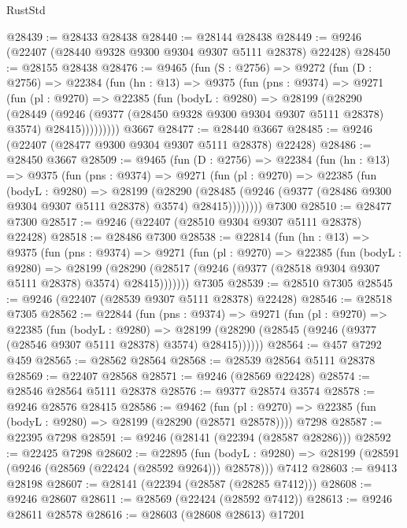 \begin{lexlean}{RustStd}
\begin{coremodule}
@28439 := @28433 @28438
@28440 := @28144 @28438
@28449 := @9246 (@22407 (@28440 @9328 @9300 @9304 @9307 @5111 @28378) @22428)
@28450 := @28155 @28438
@28476 := @9465
    (fun (S : @2756) =>
    @9272
      (fun (D : @2756) =>
      @22384
        (fun (hn : @13) =>
        @9375
          (fun (pns : @9374) =>
          @9271
            (fun (pl : @9270) =>
            @22385
              (fun (bodyL : @9280) =>
              @28199
                (@28290
                  (@28449
                    (@9246
                      (@9377 (@28450 @9328 @9300 @9304 @9307 @5111 @28378) @3574)
                      @28415)))))))))
    @3667
@28477 := @28440 @3667
@28485 := @9246 (@22407 (@28477 @9300 @9304 @9307 @5111 @28378) @22428)
@28486 := @28450 @3667
@28509 := @9465
    (fun (D : @2756) =>
    @22384
      (fun (hn : @13) =>
      @9375
        (fun (pns : @9374) =>
        @9271
          (fun (pl : @9270) =>
          @22385
            (fun (bodyL : @9280) =>
            @28199
              (@28290
                (@28485 (@9246 (@9377 (@28486 @9300 @9304 @9307 @5111 @28378) @3574) @28415))))))))
    @7300
@28510 := @28477 @7300
@28517 := @9246 (@22407 (@28510 @9304 @9307 @5111 @28378) @22428)
@28518 := @28486 @7300
@28538 := @22814
    (fun (hn : @13) =>
    @9375
      (fun (pns : @9374) =>
      @9271
        (fun (pl : @9270) =>
        @22385
          (fun (bodyL : @9280) =>
          @28199
            (@28290 (@28517 (@9246 (@9377 (@28518 @9304 @9307 @5111 @28378) @3574) @28415)))))))
    @7305
@28539 := @28510 @7305
@28545 := @9246 (@22407 (@28539 @9307 @5111 @28378) @22428)
@28546 := @28518 @7305
@28562 := @22844
    (fun (pns : @9374) =>
    @9271
      (fun (pl : @9270) =>
      @22385
        (fun (bodyL : @9280) =>
        @28199 (@28290 (@28545 (@9246 (@9377 (@28546 @9307 @5111 @28378) @3574) @28415))))))
@28564 := @457 @7292 @459
@28565 := @28562 @28564
@28568 := @28539 @28564 @5111 @28378
@28569 := @22407 @28568
@28571 := @9246 (@28569 @22428)
@28574 := @28546 @28564 @5111 @28378
@28576 := @9377 @28574 @3574
@28578 := @9246 @28576 @28415
@28586 := @9462
    (fun (pl : @9270) => @22385 (fun (bodyL : @9280) => @28199 (@28290 (@28571 @28578))))
    @7298
@28587 := @22395 @7298
@28591 := @9246 (@28141 (@22394 (@28587 @28286)))
@28592 := @22425 @7298
@28602 := @22895
    (fun (bodyL : @9280) => @28199 (@28591 (@9246 (@28569 (@22424 (@28592 @9264))) @28578)))
    @7412
@28603 := @9413 @28198
@28607 := @28141 (@22394 (@28587 (@28285 @7412)))
@28608 := @9246 @28607
@28611 := @28569 (@22424 (@28592 @7412))
@28613 := @9246 @28611 @28578
@28616 := @28603 (@28608 @28613) @17201

\end{coremodule}
\end{lexlean}
